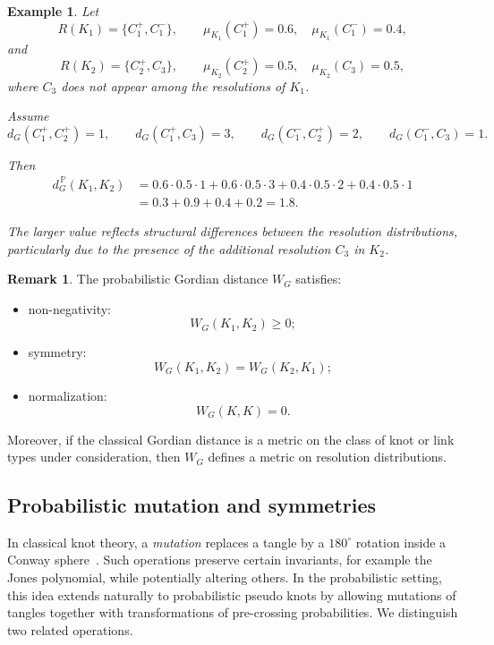 \documentclass[a4paper, reqno, 12pt]{amsart}
\theoremstyle{plain}
\newtheorem{ex}[theorem]{Example}
\theoremstyle{definition}
\newtheorem{remark}[theorem]{Remark}
\begin{document}
\begin{ex}\label{Gdistmism}\rm
Let
\[
R(K_1)=\{C_1^+,C_1^-\},
\qquad
\mu_{K_1}(C_1^+)=0.6,
\quad
\mu_{K_1}(C_1^-)=0.4,
\]
and
\[
R(K_2)=\{C_2^+,C_3\},
\qquad
\mu_{K_2}(C_2^+)=0.5,
\quad
\mu_{K_2}(C_3)=0.5,
\]
where $C_3$ does not appear among the resolutions of $K_1$.

Assume
\[
d_G(C_1^+,C_2^+)=1,
\qquad
d_G(C_1^+,C_3)=3,
\qquad
d_G(C_1^-,C_2^+)=2,
\qquad
d_G(C_1^-,C_3)=1 .
\]

Then
\[
\begin{aligned}
d_G^{\, \mathbb P}(K_1,K_2)
&=
0.6\cdot0.5\cdot1
+
0.6\cdot0.5\cdot3
+
0.4\cdot0.5\cdot2
+
0.4\cdot0.5\cdot1
\\
&=
0.3+0.9+0.4+0.2
=
1.8 .
\end{aligned}
\]

The larger value reflects structural differences between the resolution distributions, particularly due to the presence of the additional resolution $C_3$ in $K_2$.
\end{ex}



\begin{remark}\rm
The probabilistic Gordian distance \(W_G\) satisfies:
\begin{itemize}
\item[-] non-negativity:
\[
W_G(K_1,K_2)\ge 0;
\]

\item[-] symmetry:
\[
W_G(K_1,K_2)=W_G(K_2,K_1);
\]

\item[-] normalization:
\[
W_G(K,K)=0.
\]
\end{itemize}
Moreover, if the classical Gordian distance is a metric on the class of knot or link types under consideration, then \(W_G\) defines a metric on resolution distributions.
\end{remark}






\subsection{Probabilistic mutation and symmetries}

In classical knot theory, a \emph{mutation} replaces a tangle by a \(180^\circ\) rotation inside a Conway sphere~\cite{Co}. Such operations preserve certain invariants, for example the Jones polynomial, while potentially altering others. In the probabilistic setting, this idea extends naturally to probabilistic pseudo knots by allowing mutations of tangles together with transformations of pre-crossing probabilities. We distinguish two related operations.
\end{document}
